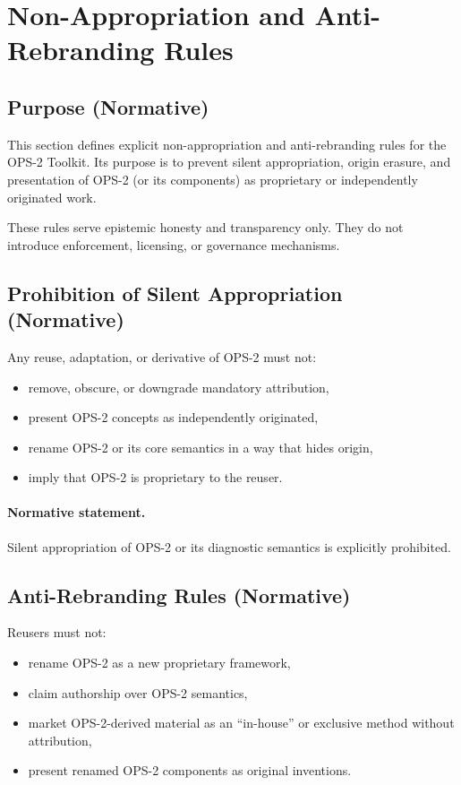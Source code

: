 \section{Non-Appropriation and Anti-Rebranding Rules}

\subsection{Purpose (Normative)}
This section defines explicit non-appropriation and anti-rebranding rules for the OPS-2 Toolkit.
Its purpose is to prevent silent appropriation, origin erasure, and presentation of OPS-2 (or its components) as proprietary or independently originated work.

These rules serve epistemic honesty and transparency only.
They do not introduce enforcement, licensing, or governance mechanisms.

\subsection{Prohibition of Silent Appropriation (Normative)}
Any reuse, adaptation, or derivative of OPS-2 must not:
\begin{itemize}
  \item remove, obscure, or downgrade mandatory attribution,
  \item present OPS-2 concepts as independently originated,
  \item rename OPS-2 or its core semantics in a way that hides origin,
  \item imply that OPS-2 is proprietary to the reuser.
\end{itemize}

\paragraph{Normative statement.}
Silent appropriation of OPS-2 or its diagnostic semantics is explicitly prohibited.

\subsection{Anti-Rebranding Rules (Normative)}
Reusers must not:
\begin{itemize}
  \item rename OPS-2 as a new proprietary framework,
  \item claim authorship over OPS-2 semantics,
  \item market OPS-2-derived material as an ``in-house'' or exclusive method without attribution,
  \item present renamed OPS-2 components as original inventions.
\end{itemize}

